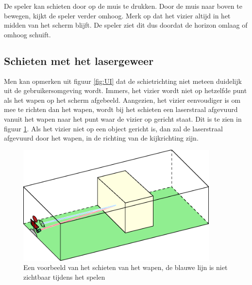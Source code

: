 De speler kan schieten door op de muis te drukken. Door de muis naar boven te bewegen, kijkt de speler verder omhoog. Merk op dat het vizier altijd in het midden van het scherm blijft. De speler ziet dit dus doordat de horizon omlaag of omhoog schuift.
\FloatBarrier
\subsection{Schieten met het lasergeweer}
Men kan opmerken uit figuur \ref{fig:UI} dat de schietrichting niet meteen duidelijk uit de gebruikersomgeving wordt. Immers, het vizier wordt niet op hetzelfde punt als het wapen op het scherm afgebeeld. Aangezien, het vizier eenvoudiger is om mee te richten dan het wapen, wordt bij het schieten een laserstraal afgevuurd vanuit het wapen naar het punt waar de vizier op gericht staat. Dit is te zien in figuur \ref{fig:COL}.  Als het vizier niet op een object gericht is, dan zal de laserstraal afgevuurd door het wapen, in de richting van de kijkrichting zijn.
\begin{figure}[H]
\includegraphics[width=0.9\textwidth]{Graphics/Collision.eps}
\caption{Een voorbeeld van het schieten van het wapen, de blauwe lijn is niet zichtbaar tijdens het spelen}
\label{fig:COL}
\end{figure}


